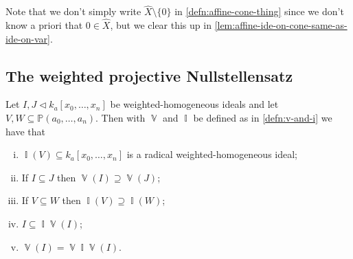 \documentclass[10pt,notitlepage]{article}
\numberwithin{equation}{subsection}
\DeclareMathOperator{\van}{\mathbb{V}}
\DeclareMathOperator{\ide}{\mathbb{I}}
\newcommand{\pee}{\mathbb{P}}
\newcommand{\noz}{\setminus\{0\}}
\newcommand{\kazn}{k_a[x_0,\ldots,x_n]}
\newcommand{\pazn}{\pee(a_0,\ldots,a_n)}
\begin{document}
    Note that we don't simply write $\hat{X}\noz$ in \cref{defn:affine-cone-thing} since we don't know a priori that $0\in\hat{X}$, but we clear this up in \cref{lem:affine-ide-on-cone-same-as-ide-on-var}.






    \subsection{The weighted projective Nullstellensatz} %
    \label{sub:the_weighted_projective_nullstellensatz}

    \begin{lemma}\label{lem:fuf}
        Let $I,J\triangleleft \kazn$ be weighted-homogeneous ideals and let $V,W\subseteq\pazn$.
        Then with $\van$ and $\ide$ be defined as in \cref{defn:v-and-i} we have that
        \begin{enumerate}[(i)]
            \item $\ide(V)\subseteq \kazn$ is a radical weighted-homogeneous ideal;
            \item If $I\subseteq J$ then $\van(I)\supseteq\van(J)$;
            \item If $V\subseteq W$ then $\ide(V)\supseteq\ide(W)$;
            \item $I\subseteq\ide\van(I)$;
            \item\label{item:fuf-van-ide-X-is-X} $\van(I)=\van\ide\van(I)$.\qedhere
        \end{enumerate}
    \end{lemma}
\end{document}
